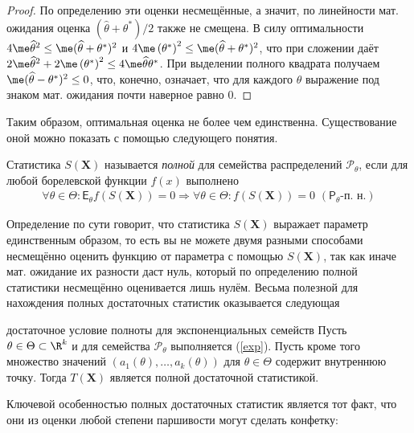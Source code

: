 \begin{proof}
    По определению эти оценки несмещённые, а значит, по линейности мат. ожидания оценка $(\widehat{\theta} + \theta^*)/2$ также не смещена. В силу оптимальности $4\me \widehat{\theta}^2 \le \me (\widehat{\theta} + \theta^*)^2$ и $4\me \left(\theta^*\right)^2 \le \me (\widehat{\theta} + \theta^*)^2$, что при сложении даёт $2\me \widehat{\theta}^2 + 2\me \left(\theta^*\right)^2 \le 4\me 
    \widehat{\theta}\theta^*$. При выделении полного квадрата получаем $\me (\widehat{\theta} - \theta^*)^2 \le 0$, что, конечно, означает, что для каждого $\theta$ выражение под знаком мат. ожидания почти наверное равно 0.
\end{proof}

Таким образом, оптимальная оценка не более чем единственна. Существование оной можно показать с помощью следующего понятия.

\begin{definition}
    Статистика $S(\mathbf X)$ называется \textit{полной} для семейства распределений $\mathcal P_{\theta}$, если для любой борелевской функции $f(x)$ выполнено
    \begin{gather*}
        \forall {\theta \in \Theta}\colon \mathsf E_{\theta}f(S(\mathbf X)) = 0 \Longrightarrow
        \forall {\theta \in \Theta}\colon f(S(\mathbf X)) = 0\,\, (\mathsf P_{\theta}\text{-п. н.})
    \end{gather*}
\end{definition}

Определение по сути говорит, что статистика $S(\mathbf X)$ выражает параметр единственным образом, то есть вы не можете двумя разными способами несмещённо оценить функцию от параметра с помощью $S(\mathbf X)$, так как иначе мат. ожидание их разности даст нуль, который по определению полной статистики несмещённо оценивается лишь нулём. Весьма полезной для нахождения полных достаточных статистик оказывается следующая

\begin{theorem}[label=suff_for_exp_family]{достаточное условие полноты для экспоненциальных семейств}{}
Пусть $\theta \in \Theta \subset \R^k$ и для семейства $\mathcal P_{\theta}$ выполняется (\ref{exp}). Пусть кроме того множество значений $(a_1(\theta), \ldots, a_k(\theta))$ для $\theta \in \Theta$ содержит внутреннюю точку. Тогда $T(\mathbf X)$ является полной достаточной статистикой.
\end{theorem}

Ключевой особенностью полных достаточных статистик является тот факт, что они из оценки любой степени паршивости могут сделать конфетку:

